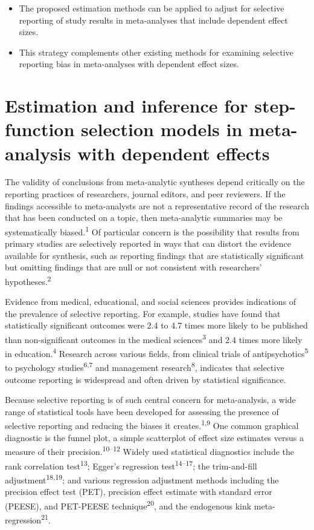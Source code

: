 \documentclass[
  american,
  man, donotrepeattitle,floatsintext]{apa7}
\begin{document}
\begin{itemize}
\item
  The proposed estimation methods can be applied to adjust for selective reporting of study results in meta-analyses that include dependent effect sizes.
\item
  This strategy complements other existing methods for examining selective reporting bias in meta-analyses with dependent effect sizes.
\end{itemize}

\newpage

\section{Estimation and inference for step-function selection models in meta-analysis with dependent effects}\label{introduction}

The validity of conclusions from meta-analytic syntheses depend critically on the reporting practices of researchers, journal editors, and peer reviewers.
If the findings accessible to meta-analysts are not a representative record of the research that has been conducted on a topic, then meta-analytic summaries may be systematically biased.\textsuperscript{1}
Of particular concern is the possibility that results from primary studies are selectively reported in ways that can distort the evidence available for synthesis, such as reporting findings that are statistically significant but omitting findings that are null or not consistent with researchers' hypotheses.\textsuperscript{2}

Evidence from medical, educational, and social sciences provides indications of the prevalence of selective reporting. For example, studies have found that statistically significant outcomes were 2.4 to 4.7 times more likely to be published than non-significant outcomes in the medical sciences\textsuperscript{3} and 2.4 times more likely in education.\textsuperscript{4} Research across various fields, from clinical trials of antipsychotics\textsuperscript{5} to psychology studies\textsuperscript{6,7} and management research\textsuperscript{8}, indicates that selective outcome reporting is widespread and often driven by statistical significance.

Because selective reporting is of such central concern for meta-analysis, a wide range of statistical tools have been developed for assessing the presence of selective reporting and reducing the biases it creates.\textsuperscript{1,9}
One common graphical diagnostic is the funnel plot, a simple scatterplot of effect size estimates versus a measure of their precision.\textsuperscript{10--12} Widely used statistical diagnostics include the rank correlation test\textsuperscript{13}; Egger's regression test\textsuperscript{14--17}; the trim-and-fill adjustment\textsuperscript{18,19}; and various regression adjustment methods including the precision effect test (PET), precision effect estimate with standard error (PEESE), and PET-PEESE technique\textsuperscript{20}, and the endogenous kink meta-regression\textsuperscript{21}.
\end{document}
